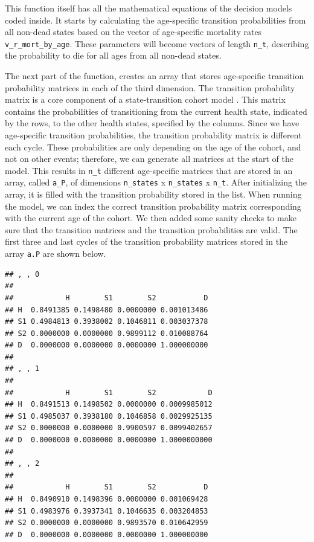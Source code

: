 \documentclass[]{book}
\newenvironment{Shaded}{\begin{snugshade}}{\end{snugshade}}
\newcommand{\CommentTok}[1]{\textcolor[rgb]{0.56,0.35,0.01}{\textit{#1}}}
\newcommand{\DecValTok}[1]{\textcolor[rgb]{0.00,0.00,0.81}{#1}}
\newcommand{\NormalTok}[1]{#1}
\newcommand{\OperatorTok}[1]{\textcolor[rgb]{0.81,0.36,0.00}{\textbf{#1}}}
\begin{document}
This function itself has all the mathematical equations of the decision models coded inside. It starts by calculating the age-specific transition probabilities from all non-dead states based on the vector of age-specific mortality rates \texttt{v\_r\_mort\_by\_age}. These parameters will become vectors of length \texttt{n\_t}, describing the probability to die for all ages from all non-dead states.

The next part of the function, creates an array that stores age-specific transition probability matrices in each of the third dimension. The transition probability matrix is a core component of a state-transition cohort model \citep{Iskandar2018}. This matrix contains the probabilities of transitioning from the current health state, indicated by the rows, to the other health states, specified by the columns. Since we have age-specific transition probabilities, the transition probability matrix is different each cycle. These probabilities are only depending on the age of the cohort, and not on other events; therefore, we can generate all matrices at the start of the model. This results in \texttt{n\_t} different age-specific matrices that are stored in an array, called \texttt{a\_P}, of dimensions \texttt{n\_states} x \texttt{n\_states} x \texttt{n\_t}. After initializing the array, it is filled with the transition probability stored in the list. When running the model, we can index the correct transition probability matrix corresponding with the current age of the cohort. We then added some sanity checks to make sure that the transition matrices and the transition probabilities are valid. The first three and last cycles of the transition probability matrices stored in the array \texttt{a.P} are shown below.

\begin{Shaded}
\end{Shaded}

\begin{verbatim}
## , , 0
## 
##            H        S1        S2           D
## H  0.8491385 0.1498480 0.0000000 0.001013486
## S1 0.4984813 0.3938002 0.1046811 0.003037378
## S2 0.0000000 0.0000000 0.9899112 0.010088764
## D  0.0000000 0.0000000 0.0000000 1.000000000
## 
## , , 1
## 
##            H        S1        S2            D
## H  0.8491513 0.1498502 0.0000000 0.0009985012
## S1 0.4985037 0.3938180 0.1046858 0.0029925135
## S2 0.0000000 0.0000000 0.9900597 0.0099402657
## D  0.0000000 0.0000000 0.0000000 1.0000000000
## 
## , , 2
## 
##            H        S1        S2           D
## H  0.8490910 0.1498396 0.0000000 0.001069428
## S1 0.4983976 0.3937341 0.1046635 0.003204853
## S2 0.0000000 0.0000000 0.9893570 0.010642959
## D  0.0000000 0.0000000 0.0000000 1.000000000
\end{verbatim}
\end{document}
